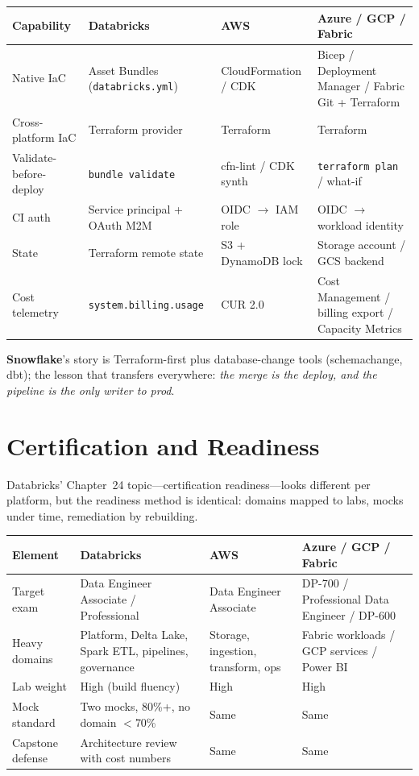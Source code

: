 \begin{center}
\footnotesize
\begin{tabular}{@{}p{3.0cm}p{3.4cm}p{3.2cm}p{3.2cm}@{}}
\toprule
\textbf{Capability} & \textbf{Databricks} & \textbf{AWS} & \textbf{Azure / GCP / Fabric} \\
\midrule
Native IaC & Asset Bundles (\texttt{databricks.yml}) & CloudFormation / CDK & Bicep / Deployment Manager / Fabric Git + Terraform \\
Cross-platform IaC & Terraform provider & Terraform & Terraform \\
Validate-before-deploy & \texttt{bundle validate} & cfn-lint / CDK synth & \texttt{terraform plan} / what-if \\
CI auth & Service principal + OAuth M2M & OIDC $\rightarrow$ IAM role & OIDC $\rightarrow$ workload identity \\
State & Terraform remote state & S3 + DynamoDB lock & Storage account / GCS backend \\
Cost telemetry & \texttt{system.billing.usage} & CUR 2.0 & Cost Management / billing export / Capacity Metrics \\
\bottomrule
\end{tabular}
\end{center}

\noindent \textbf{Snowflake}'s story is Terraform-first plus database-change tools
(schemachange, dbt); the lesson that transfers everywhere: \emph{the merge is the deploy, and
the pipeline is the only writer to prod}.

\section{Certification and Readiness}
%
Databricks' Chapter~24 topic---certification readiness---looks different per platform, but the
readiness method is identical: domains mapped to labs, mocks under time, remediation by
rebuilding.

\begin{center}
\footnotesize
\begin{tabular}{@{}p{3.0cm}p{3.4cm}p{3.2cm}p{3.2cm}@{}}
\toprule
\textbf{Element} & \textbf{Databricks} & \textbf{AWS} & \textbf{Azure / GCP / Fabric} \\
\midrule
Target exam & Data Engineer Associate / Professional & Data Engineer Associate & DP-700 / Professional Data Engineer / DP-600 \\
Heavy domains & Platform, Delta Lake, Spark ETL, pipelines, governance & Storage, ingestion, transform, ops & Fabric workloads / GCP services / Power BI \\
Lab weight & High (build fluency) & High & High \\
Mock standard & Two mocks, 80\%+, no domain $<$70\% & Same & Same \\
Capstone defense & Architecture review with cost numbers & Same & Same \\
\bottomrule
\end{tabular}
\end{center}

